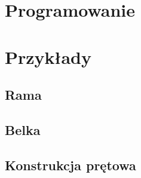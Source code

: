 \newpage
\section{Programowanie}

\newpage
\section{Przykłady}
\subsection{Rama}

\newpage
\subsection{Belka}

\newpage
\subsection{Konstrukcja prętowa}
